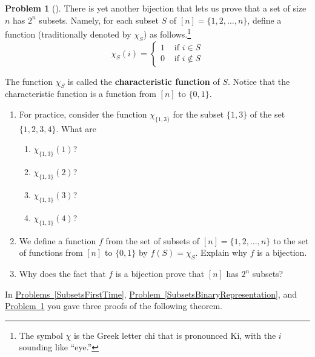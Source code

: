 \documentclass[10pt,]{book}
\newcommand{\terminology}[1]{\textbf{#1}}
\theoremstyle{plain}
\theoremstyle{definition}
\newtheorem{activity}[project]{Problem}
\theoremstyle{definition}
\numberwithin{equation}{chapter}
\newcommand{\amp}{&}
\begin{document}
\begin{activity}[]\marginsymbol[-1em]{} \label{charfunction}
There is yet another bijection that lets us prove that a set of size \(n\) has \(2^n\) subsets. Namely, for each subset \(S\) of \([n]=\{1,2,\ldots, n\}\), define a function (traditionally denoted by \(\chi_S\)) as follows.\footnote{The symbol \(\chi\) is the Greek letter chi that is pronounced Ki, with the \(i\) sounding like ``eye.''\label{fn-1}}%
\begin{equation*}
\chi_S(i) = \begin{cases}1 \amp \text{ if }  i\in S \\ 0 \amp \text{ if }  i\not\in
S
\end{cases}
\end{equation*}
%
\par
The function \(\chi_S\) is called the \terminology{characteristic function} of \(S\). Notice that the characteristic function is a function from \([n]\) to \(\{0,1\}\).%
\begin{enumerate}[font=\bfseries,label=(\alph*),ref=\alph*]
\item\label{task-28} \marginsymbol[-2.5em]{} For practice, consider the function \(\chi_{\{1,3\}}\) for the subset \(\{1,3\}\) of the set \(\{1,2,3,4\}\).  What are%
\begin{enumerate}[font=\bfseries,label=(\roman*),ref=\theenumi.\roman*]
\item\label{task-29} \marginsymbol[-2.5em]{} \(\chi_{\{1,3\}}(1)\)?%
\item\label{task-30} \marginsymbol[-2.5em]{} \(\chi_{\{1,3\}}(2)\)?%
\item\label{task-31} \marginsymbol[-2.5em]{} \(\chi_{\{1,3\}}(3)\)?%
\item\label{task-32} \marginsymbol[-2.5em]{} \(\chi_{\{1,3\}}(4)\)?%
\end{enumerate}
\item\label{task-33} \marginsymbol[-2.5em]{} We define a function \(f\) from the set of subsets of \([n]=\{1,2,\ldots, n\}\) to the set of functions from \([n]\) to \(\{0,1\}\) by \(f(S)=\chi_S\).  Explain why \(f\) is a bijection.%
\item\label{task-34} \marginsymbol[-2.5em]{} Why does the fact that \(f\) is a bijection prove that \([n]\) has \(2^n\) subsets?%
\end{enumerate}
\end{activity}
In \hyperref[SubsetsFirstTime]{Problems~\ref{SubsetsFirstTime}}, \hyperref[SubsetsBinaryRepresentation]{Problem~\ref{SubsetsBinaryRepresentation}}, and \hyperref[charfunction]{Problem~\ref{charfunction}} you gave three proofs of the following theorem.%
\end{document}
